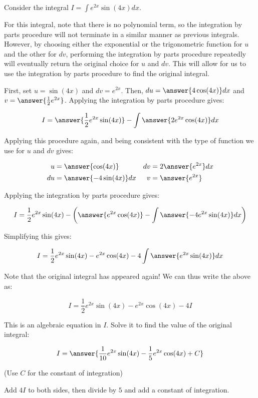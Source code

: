 \documentclass{ximera}
\author{Jim Talamo}
\begin{document}
\begin{exercise}
Consider the integral $I = \int e^{2x}\sin(4x) dx $.

For this integral, note that there is no polynomial term, so the integration by parts procedure will not terminate in a similar manner as previous integrals.  However, by choosing either the exponential or the trigonometric function for $u$ and the other for $dv$, performing the integration by parts procedure repeatedly will eventually return the original choice for $u$ and $dv$.  This will allow for us to use the integration by parts procedure to find the original integral.

First, set $u = \sin(4x)$ and $dv =  e^{2x}$.  Then, $du = \answer{4 \cos(4x)} dx$ and $v = \answer{\frac{1}{2}e^{2x}}$.  Applying the integration by parts procedure gives:

\[
I = \answer{\frac{1}{2} e^{2x}\sin(4x)}-\int \answer{2 e^{2x}\cos(4x)} dx
\] 

\begin{exercise}
Applying this procedure again, and being consistent with the type of function we use for $u$ and $dv$ gives:

\begin{align*}
u  &=  \answer{\cos(4x)} & dv &= 2 \answer{e^{2x}} dx \\
du &= \answer{-4\sin(4x)} dx & v &= \answer{ e^{2x}}
\end{align*}

Applying the integration by parts procedure gives:

\[
I = \frac{1}{2}e^{2x}\sin(4x)-\left(\answer{e^{2x}\cos(4x)} - \int \answer{-4 e^{2x}\sin(4x)} dx \right)
\] 

\begin{exercise}
Simplifying this gives:

\[
I = \frac{1}{2}e^{2x}\sin(4x)-e^{2x}\cos(4x) - 4 \int \answer{e^{2x}\sin(4x)} dx 
\] 

Note that the original integral has appeared again!  We can thus write the above as:

\[
I = \frac{1}{2}e^{2x}\sin(4x)-e^{2x}\cos(4x) - 4 I 
\] 

This is an algebraic equation in $I$.  Solve it to find the value of the original integral:

\[
I = \answer{\frac{1}{10}e^{2x}\sin(4x)-\frac{1}{5}e^{2x}\cos(4x) +C}
\] 

(Use $C$ for the constant of integration)

\begin{hint}
Add $4I$ to both sides, then divide by $5$ and add a constant of integration.
\end{hint}


\end{exercise}
\end{exercise}
\end{exercise}
\end{document}
